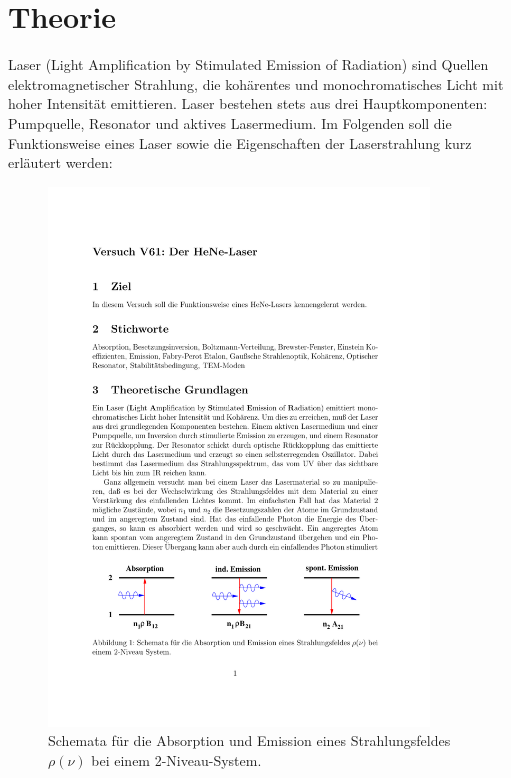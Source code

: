 \section{Theorie}
\label{sec:theorie}

Laser (Light Amplification by Stimulated Emission of Radiation) sind Quellen
elektromagnetischer Strahlung, die kohärentes und monochromatisches Licht mit
hoher Intensität emittieren. Laser bestehen stets aus drei Hauptkomponenten:
Pumpquelle, Resonator und aktives Lasermedium. Im Folgenden soll die
Funktionsweise eines Laser sowie die Eigenschaften der Laserstrahlung kurz
erläutert werden:

\begin{figure}[htb]
  \centering
  \includegraphics[width=0.9\textwidth]{figures/fig_Übergänge.pdf}
  \caption{Schemata für die Absorption und Emission eines
  Strahlungsfeldes~$\rho(\nu)$ bei einem \num{2}-Niveau-System.}
  \label{fig:Übergänge}
\end{figure}


